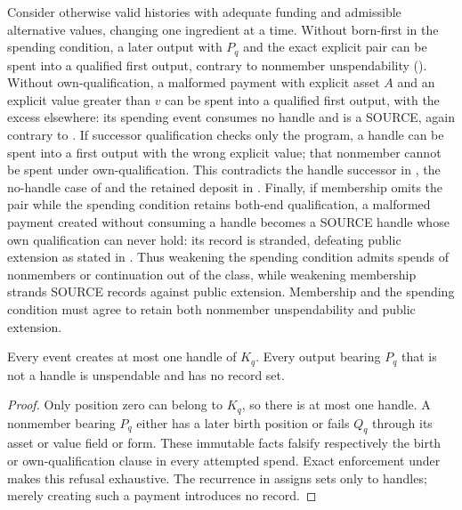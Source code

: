 \documentclass[../main.tex]{subfiles}
\begin{document}
\begin{remark}
\label{rem:kpcfixed-model:qualification-necessity}
Consider otherwise valid histories with adequate funding and admissible
alternative values, changing one ingredient at a time. Without born-first
in the spending condition, a
later output with $P_q$ and the exact explicit pair can be spent into a
qualified first output, contrary to nonmember unspendability
(). Without
own-qualification, a malformed payment with explicit asset $A$ and an
explicit value greater than $v$ can be spent into a qualified first output,
with the excess elsewhere: its spending event consumes no handle and is
a SOURCE, again contrary to . If successor
qualification checks only the program, a handle can be spent into a
first output with the wrong explicit value; that nonmember cannot be
spent under own-qualification. This contradicts the handle successor in
, the no-handle case of
 and the retained deposit in
. Finally, if membership omits the pair while the
spending condition retains both-end qualification, a malformed payment
created without consuming a handle becomes a SOURCE handle whose own
qualification can never hold: its record is stranded, defeating public
extension as stated in . Thus weakening
the spending condition admits spends of nonmembers or continuation out of
the class, while weakening membership strands SOURCE records against public
extension. Membership and the spending condition must agree to retain both
nonmember unspendability and public extension.
\end{remark}

\begin{proposition}
\label{prop:kpcfixed-model:single-birth}
Every event creates at most one handle of $K_q$. Every output bearing
$P_q$ that is not a handle is unspendable and has no record set.
\end{proposition}
\begin{proof}
Only position zero can belong to $K_q$, so there is at most one handle.
A nonmember bearing $P_q$ either has a later birth position or fails
$Q_q$ through its asset or value field or form. These immutable facts
falsify respectively the birth or own-qualification clause in every
attempted spend. Exact enforcement under
 makes this refusal exhaustive.
The recurrence in  assigns
sets only to handles; merely creating such a payment introduces no record.
\end{proof}
\end{document}
